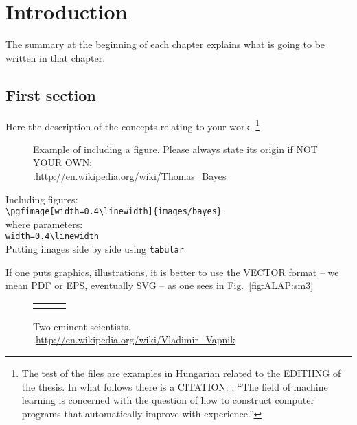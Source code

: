 \chapter{Introduction}\label{ch:INTRO}

\begin{summary}
	 The summary at the beginning of each chapter explains what is going to be written in that chapter.
\end{summary}

\section{First section}\label{sec:INTRO:ml}

Here the description of the concepts relating to your work.%
\footnote{ %
The test of the files are examples in Hungarian related to the EDITIING of the thesis. In what follows there is a CITATION: :\newline
    ``The field of machine learning is concerned with the question of how to construct computer programs    that automatically improve with experience.''
}




\begin{figure}[t]
  \centering
  \caption[Example figure]%
  {Example of including a figure. Please always state its origin if NOT YOUR OWN:\\
  {\white .}\hfill\url{http://en.wikipedia.org/wiki/Thomas_Bayes}}
  \label{fig:ALAP:sm1}
\end{figure}

Including figures:\\
 \verb+\pgfimage[width=0.4\linewidth]{images/bayes}+\\
where parameters:\\
\verb+width=0.4\linewidth+ \\

Putting images side by side using \verb+tabular+


If one puts graphics, illustrations, it is better to use the VECTOR format -- we mean PDF or EPS, eventually SVG -- as one sees in Fig.~\ref{fig:ALAP:sm3}

\begin{figure}[t]
  \centering
  \begin{tabular}{ccc}
		  \pgfimage[height=4cm]{images/bayes}
		  &
		  \pgfimage[height=4cm]{images/vapnik}
	\end{tabular}
  \caption[Side by side example]%
  {Two eminent scientists.\\
  {\white .}\url{http://en.wikipedia.org/wiki/Vladimir_Vapnik}}
  \label{fig:ALAP:sm2}
\end{figure}

